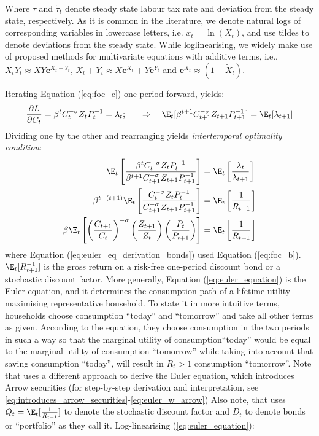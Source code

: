Where $\tau$ and $\tilde{\tau}_t$ denote steady state labour tax rate and deviation from the steady state, respectively. As it is common in the literature, we denote natural logs of corresponding variables in lowercase letters, i.e. $x_t = \ln(X_t)$, and use tildes to denote deviations from the steady state. While loglinearising, we widely make use of \textcite{uhlig_1995_a} proposed methods for multivariate equations with additive terms, i.e., $X_tY_t \approx XY\mathbf{e}^{\tilde{X}_t + \tilde{Y}_t}$, $X_t + Y_t \approx X\mathbf{e}^{\tilde{X}_t} + Y\mathbf{e}^{\tilde{Y}_t}$ and $\mathbf{e}^{\tilde{X}_t} \approx (1 + \tilde{X}_t)$. 

Iterating Equation (\ref{eq:foc_c}) one period forward, yields:
\begin{align*}
    \frac{\partial L}{\partial C_t}     &= \beta^t C_t^{-\sigma}Z_t P_{t}^{-1} = \lambda_t; \quad &\Rightarrow \quad \E_t[\beta^{t+1} C_{t+1}^{-\sigma}Z_{t+1} P_{t+1}^{-1}] = \E_t[\lambda_{t+1}]
\end{align*}
Dividing one by the other and rearranging yields \textit{intertemporal optimality condition}:
\begin{align}
    \E_t\left[\frac{\beta^t C_t^{-\sigma}Z_t P_{t}^{-1}}{\beta^{t+1} C_{t+1}^{-\sigma}Z_{t+1} P_{t+1}^{-1}}\right]                 & = \E_t\left[\frac{\lambda_t}{\lambda_{t+1}}\right] \\
    \beta^{t-(t+1)}\E_t\left[\frac{C_t^{-\sigma}Z_t P_{t}^{-1}}{C_{t+1}^{-\sigma}Z_{t+1} P_{t+1}^{-1}}\right]                 & = \E_t\left[\frac{1}{R_{t+1}}\right] \label{eq:euler_eq_derivation_bonds}\\
    \beta\E_t\left[\left(\frac{C_{t+1}}{C_{t}}\right)^{-\sigma} \left(\frac{Z_{t+1}}{Z_t}\right) \left(\frac{P_{t}}{ P_{t+1}}\right)\right]                 &= \E_t \left[\frac{1}{R_{t+1}}\right] \label{eq:euler_equation}
\end{align}
where Equation (\ref{eq:euler_eq_derivation_bonds}) used Equation (\ref{eq:foc_b}). $\E_t [ R^{-1}_{t+1}]$ is the gross return on a risk-free one-period discount bond or a stochastic discount factor. More generally, Equation (\ref{eq:euler_equation}) is the Euler equation, and it determines the consumption path of a lifetime utility-maximising representative household. To state it in more intuitive terms, households choose consumption ``today'' and ``tomorrow'' and take all other terms as given. According to the equation, they choose consumption in the two periods in such a way so that the marginal utility of consumption``today'' would be equal to the marginal utility of consumption ``tomorrow'' while taking into account that saving consumption ``today'', will result in $R_t > 1$ consumption ``tomorrow''. Note that \textcite{jordigal_2015_monetary} uses a different approach to derive the Euler equation, which introduces Arrow securities (for step-by-step derivation and interpretation, see \ref{eq:introduces_arrow_securities}-\ref{eq:euler_w_arrow}) Also note, that \citereset\textcite{jordigal_2015_monetary} uses $Q_t = \E_t [ \frac{1}{R_{t+1}}]$ to denote the stochastic discount factor and $D_t$ to denote bonds or ``portfolio'' as they call it. Log-linearising (\ref{eq:euler_equation}):
